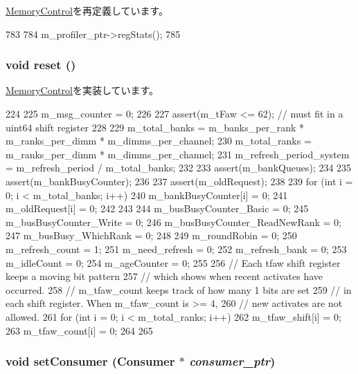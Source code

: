 \hyperlink{classMemoryControl_ac1739a9be0fbd5d96cf441cd3b2c1c78}{MemoryControl}を再定義しています。


\begin{DoxyCode}
783 {
784     m_profiler_ptr->regStats();
785 }
\end{DoxyCode}
\hypertarget{classRubyMemoryControl_ad20897c5c8bd47f5d4005989bead0e55}{
\subsubsection[{reset}]{\setlength{\rightskip}{0pt plus 5cm}void reset ()}}
\label{classRubyMemoryControl_ad20897c5c8bd47f5d4005989bead0e55}


\hyperlink{classMemoryControl_a20dcbdfbd0ec77afc802522bb7e379c1}{MemoryControl}を実装しています。


\begin{DoxyCode}
224 {
225     m_msg_counter = 0;
226 
227     assert(m_tFaw <= 62); // must fit in a uint64 shift register
228 
229     m_total_banks = m_banks_per_rank * m_ranks_per_dimm * m_dimms_per_channel;
230     m_total_ranks = m_ranks_per_dimm * m_dimms_per_channel;
231     m_refresh_period_system = m_refresh_period / m_total_banks;
232 
233     assert(m_bankQueues);
234 
235     assert(m_bankBusyCounter);
236 
237     assert(m_oldRequest);
238 
239     for (int i = 0; i < m_total_banks; i++) {
240         m_bankBusyCounter[i] = 0;
241         m_oldRequest[i] = 0;
242     }
243 
244     m_busBusyCounter_Basic = 0;
245     m_busBusyCounter_Write = 0;
246     m_busBusyCounter_ReadNewRank = 0;
247     m_busBusy_WhichRank = 0;
248 
249     m_roundRobin = 0;
250     m_refresh_count = 1;
251     m_need_refresh = 0;
252     m_refresh_bank = 0;
253     m_idleCount = 0;
254     m_ageCounter = 0;
255 
256     // Each tfaw shift register keeps a moving bit pattern
257     // which shows when recent activates have occurred.
258     // m_tfaw_count keeps track of how many 1 bits are set
259     // in each shift register.  When m_tfaw_count is >= 4,
260     // new activates are not allowed.
261     for (int i = 0; i < m_total_ranks; i++) {
262         m_tfaw_shift[i] = 0;
263         m_tfaw_count[i] = 0;
264     }
265 }
\end{DoxyCode}
\hypertarget{classRubyMemoryControl_a8487c37680239f103e21ada9acf1726d}{
\subsubsection[{setConsumer}]{\setlength{\rightskip}{0pt plus 5cm}void setConsumer ({\bf Consumer} $\ast$ {\em consumer\_\-ptr})}}
\label{classRubyMemoryControl_a8487c37680239f103e21ada9acf1726d}


